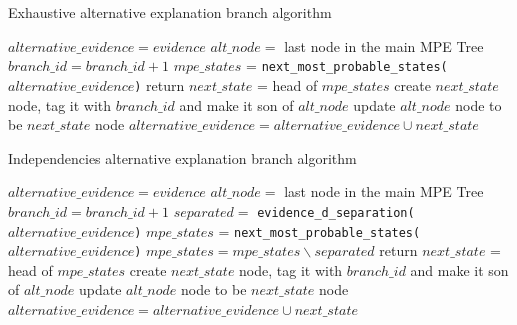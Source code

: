 \begin{algorithm}[htp!]
	\caption{Exhaustive alternative explanation branch algorithm}
	\label{alg:alternative-branch-echaustive}
	\begin{algorithmic}
		\STATE $alternative\_evidence = evidence$ 
		\STATE $alt\_node = $ last node in the main MPE Tree
		\STATE $branch\_id = branch\_id + 1$
			\STATE $mpe\_states$ = \texttt{next\_most\_probable\_states($alternative\_evidence$)}
				\STATE return
			\ELSE
				\STATE $next\_state$ = head of $mpe\_states$ 
				\STATE create $next\_state$ node, tag it with $branch\_id$ and make it son of $alt\_node$
				\STATE update $alt\_node$ node to be $next\_state$ node
				\STATE $alternative\_evidence = alternative\_evidence \cup next\_state$
			\ENDIF
		\ENDWHILE
	\end{algorithmic}
\end{algorithm}

\begin{algorithm}[htp!]
	\caption{Independencies alternative explanation branch algorithm}
	\label{alg:alternative-branch-independencies}
	\begin{algorithmic}
		\STATE $alternative\_evidence = evidence$ 
		\STATE $alt\_node = $ last node in the main MPE Tree
		\STATE $branch\_id = branch\_id + 1$
		\WHILE{True} 
			\STATE $separated = $ \texttt{evidence\_d\_separation($alternative\_evidence$)}
			\STATE $mpe\_states$ = \texttt{next\_most\_probable\_states($alternative\_evidence$)}
			\STATE $mpe\_states = mpe\_states \smallsetminus separated$ 
			\IF{$mpe\_states$ is empty}
				\STATE return
			\ELSE
				\STATE $next\_state$ = head of $mpe\_states$ 
				\STATE create $next\_state$ node, tag it with $branch\_id$ and make it son of $alt\_node$
				\STATE update $alt\_node$ node to be $next\_state$ node
				\STATE $alternative\_evidence = alternative\_evidence \cup next\_state$
			\ENDIF
		\ENDWHILE
	\end{algorithmic}
\end{algorithm} 

